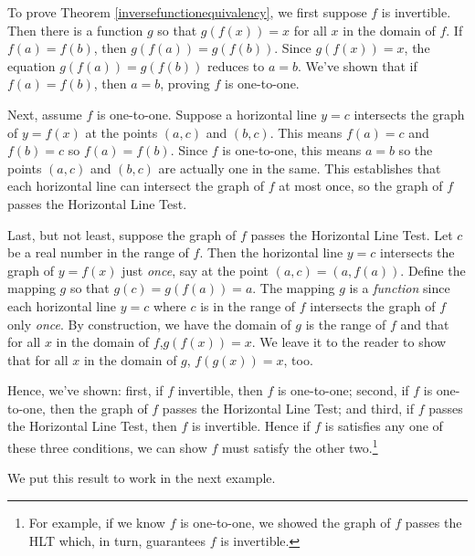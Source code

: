 \documentclass{ximera}
\begin{document}
To prove Theorem \ref{inversefunctionequivalency}, we first suppose $f$ is invertible.  Then there is a function $g$ so that $g(f(x)) = x$ for all $x$ in the domain of $f$.    If $f(a) = f(b)$, then $g(f(a)) = g(f(b))$.  Since $g(f(x)) = x$, the equation $g(f(a)) = g(f(b))$ reduces to $a = b$. We've shown that if $f(a) = f(b)$, then $a = b$, proving $f$ is one-to-one.

\smallskip

Next, assume $f$ is one-to-one.  Suppose a horizontal line $y=c$ intersects the graph of $y = f(x)$ at the points $(a,c)$ and $(b,c)$.  This means $f(a) = c$ and $f(b) = c$ so $f(a) = f(b)$.  Since $f$ is one-to-one, this means $a=b$ so the points $(a,c)$ and $(b,c)$ are actually one in the same.  This establishes that each horizontal line can intersect the graph of $f$ at most once, so the graph of $f$ passes the Horizontal Line Test.

\smallskip

Last, but not least, suppose the graph of $f$ passes the Horizontal Line Test.  Let  $c$ be a real number in the range of $f$.  Then the horizontal line $y=c$ intersects the graph of $y=f(x)$ just \textit{once}, say at the point $(a,c) = (a, f(a))$.  Define the mapping $g$ so that $g(c) = g(f(a)) = a$.  The mapping $g$ is a \textit{function} since each horizontal line $y=c$ where $c$ is in the range of $f$ intersects the graph of $f$ only \textit{once}.  By construction, we have the domain of $g$ is the range of $f$ and that for all $x$ in the domain of $f$,$g(f(x)) = x$.  We leave it to the reader to show that for all $x$ in the domain of $g$, $f(g(x)) = x$, too.

\smallskip

Hence, we've shown:  first,  if $f$ invertible, then $f$ is one-to-one; second,   if $f$ is one-to-one, then the graph of $f$ passes the Horizontal Line Test; and third,  if $f$ passes the Horizontal Line Test, then $f$ is invertible.  Hence if $f$ is satisfies any one of these three conditions, we can show $f$ must satisfy the other two.\footnote{For example, if we know $f$ is one-to-one, we showed the graph of $f$ passes the HLT which, in turn, guarantees $f$ is invertible.}

\smallskip

We put this result to work in the next example.

\smallskip
\end{document}
